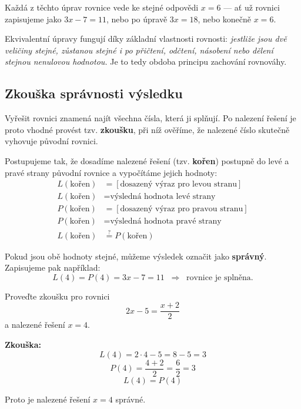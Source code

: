 \documentclass[12pt,a4paper]{article}
\begin{document}
Každá z těchto úprav rovnice vede ke stejné odpovědi $x = 6$ — ať už rovnici zapisujeme 
jako $3x - 7 = 11$, nebo po úpravě $3x = 18$, nebo konečně $x = 6$.

\begin{notebox}
    Ekvivalentní úpravy fungují díky základní vlastnosti rovnosti:  
    \textit{jestliže jsou dvě veličiny stejné, zůstanou stejné i po přičtení, odčtení, násobení nebo dělení stejnou nenulovou hodnotou.}  
    Je to tedy obdoba principu zachování rovnováhy.
\end{notebox}



\subsection{Zkouška správnosti výsledku}

Vyřešit rovnici znamená najít všechna čísla, která ji splňují.  
Po nalezení řešení je proto vhodné provést tzv. \textbf{zkoušku}, 
při níž ověříme, že nalezené číslo skutečně vyhovuje původní rovnici.

Postupujeme tak, že dosadíme nalezené řešení (tzv. \textbf{kořen}) postupně do levé a 
pravé strany původní rovnice a vypočítáme jejich hodnoty:
\[
\begin{aligned}
L(\text{kořen}) &= [\text{dosazený výraz pro levou stranu}]\\
L(\text{kořen}) &= \text{výsledná hodnota levé strany}\\[6pt]
P(\text{kořen}) &= [\text{dosazený výraz pro pravou stranu}]\\
P(\text{kořen}) &= \text{výsledná hodnota pravé strany}\\[6pt]
L(\text{kořen}) &\stackrel{?}{=} P(\text{kořen})
\end{aligned}
\]


Pokud jsou obě hodnoty stejné, můžeme výsledek označit jako \textbf{správný}.  
Zapisujeme pak například:
\[
L(4) = P(4) = 3x - 7 = 11 \;\;\Rightarrow\;\; \text{rovnice je splněna.}
\]

\begin{examplebox}
Proveďte zkoušku pro rovnici
\[
2x - 5 = \frac{x + 2}{2}
\]
a nalezené řešení $x = 4$.

\textbf{Zkouška:}
\[
L(4) = 2 \cdot 4 - 5 = 8 - 5 = 3
\]
\[
P(4) = \frac{4 + 2}{2} = \frac{6}{2} = 3
\]
\[
L(4) = P(4)
\]

Proto je nalezené řešení $x = 4$ správné.
\end{examplebox}
\end{document}
